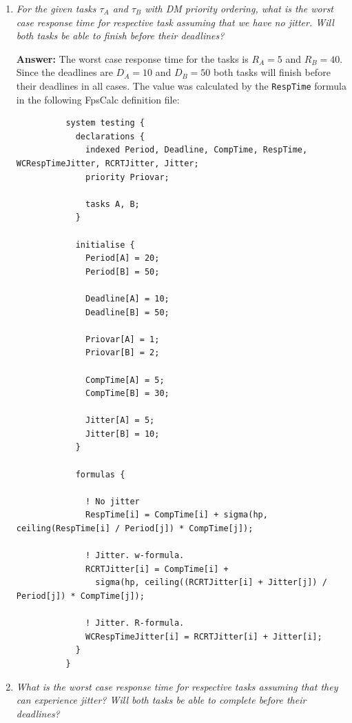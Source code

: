 \documentclass[a4paper,10pt]{article}
\newcommand{\answer}{\textbf{Answer: }}
\begin{document}
\begin{enumerate}
	\item \emph{For the given tasks $\tau_A$ and $\tau_B$ with DM priority ordering, what is the worst case response time for respective task assuming that we have no jitter. Will both tasks be able to finish before their deadlines?}
	
	\answer The worst case response time for the tasks is $R_A = 5$ and $R_B = 40$. Since the deadlines are $D_A = 10$ and $D_B = 50$ both tasks will finish before their deadlines in all cases. The value was calculated by the \texttt{RespTime} formula in the following FpsCalc definition file:

	\begin{lstlisting}
          system testing {
            declarations {		
              indexed Period, Deadline, CompTime, RespTime, WCRespTimeJitter, RCRTJitter, Jitter;
              priority Priovar;	
              
              tasks A, B;
            }
            
            initialise {      
              Period[A] = 20;
              Period[B] = 50;
              
              Deadline[A] = 10;
              Deadline[B] = 50;
              
              Priovar[A] = 1;
              Priovar[B] = 2;
              
              CompTime[A] = 5;
              CompTime[B] = 30;
              
              Jitter[A] = 5;
              Jitter[B] = 10;
            }
            
            formulas {
              
              ! No jitter
              RespTime[i] = CompTime[i] + sigma(hp, ceiling(RespTime[i] / Period[j]) * CompTime[j]);
              
              ! Jitter. w-formula.
              RCRTJitter[i] = CompTime[i] + 
			    sigma(hp, ceiling((RCRTJitter[i] + Jitter[j]) / Period[j]) * CompTime[j]);
              
              ! Jitter. R-formula.
              WCRespTimeJitter[i] = RCRTJitter[i] + Jitter[i];
            }
          }
	\end{lstlisting}

	\item \emph{What is the worst case response time for respective tasks assuming that they can experience jitter? Will both tasks be able to complete before their deadlines?}
	

\end{enumerate}
\end{document}

